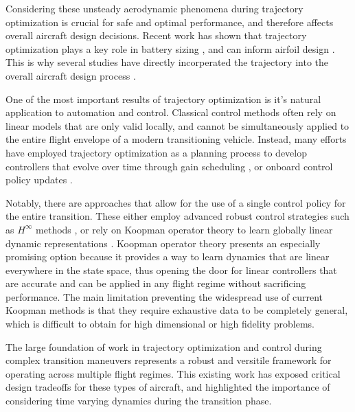\documentclass[12pt, letterpaper]{article}
\begin{document}
Considering these unsteady aerodynamic phenomena during trajectory optimization is crucial for safe and optimal performance, and therefore affects overall aircraft design decisions.  Recent work has shown that trajectory optimization plays a key role in battery sizing \cite{liu2024flight}, and can inform airfoil design \cite{panish2025tiltwing}.  This is why several studies have directly incorperated the trajectory into the overall aircraft design process \cite{sarojini2023large, kaneko2024simultaneous, kaneko2025simultaneous}. 

One of the most important results of trajectory optimization is it's natural application to automation and control.  Classical control methods often rely on linear models that are only valid locally, and cannot be simultaneously applied to the entire flight envelope of a modern transitioning vehicle.  Instead, many efforts have employed trajectory optimization as a planning process to develop controllers that evolve over time through gain scheduling \cite{thompson2020robust}, or onboard control policy updates \cite{gupta2025realtimeplanningcontrolvortex}.

Notably, there are approaches that allow for the use of a single control policy for the entire transition.  These either employ advanced robust control strategies such as $H^{\infty}$ methods \cite{yang2021robust}, or rely on Koopman operator theory to learn globally linear dynamic representations \cite{korda2018koopman, abraham2017modelbased, zinage2021koopman}.  Koopman operator theory presents an especially promising option because it provides a way to learn dynamics that are linear everywhere in the state space, thus opening the door for linear controllers that are accurate and can be applied in any flight regime without sacrificing performance.  The main limitation preventing the widespread use of current Koopman methods is that they require exhaustive data to be completely general, which is difficult to obtain for high dimensional or high fidelity problems. 

The large foundation of work in trajectory optimization and control during complex transition maneuvers represents a robust and versitile framework for operating across multiple flight regimes.  This existing work has exposed critical design tradeoffs for these types of aircraft, and highlighted the importance of considering time varying dynamics during the transition phase.  
\end{document}
